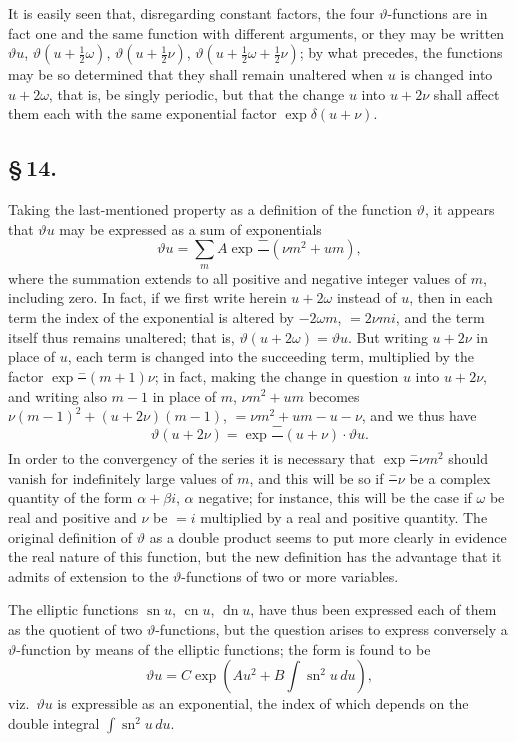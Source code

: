 \documentclass[11pt,a4paper]{article}
\DeclareMathOperator{\sn}{sn}
\DeclareMathOperator{\cn}{cn}
\DeclareMathOperator{\dn}{dn}
\begin{document}
It is easily seen that, disregarding constant factors, the four $\vartheta$-functions are in fact one and the same function with different arguments, or they may be written $\vartheta u$, $\vartheta(u + \frac{1}{2}\omega)$, $\vartheta(u + \frac{1}{2}\nu)$, $\vartheta(u + \frac{1}{2}\omega + \frac{1}{2}\nu)$; by what precedes, the functions may be so determined that they shall remain unaltered when $u$ is changed into $u + 2\omega$, that is, be singly periodic, but that the change $u$ into $u + 2\nu$ shall affect them each with the same exponential factor $\exp\delta(u + \nu)$.

\subsection*{\S\,14.}

Taking the last-mentioned property as a definition of the function $\vartheta$, it appears that $\vartheta u$ may be expressed as a sum of exponentials
\[
\vartheta u = \sum_{m} A\exp\frac{-}{}(\nu m^{2} + um),
\]
where the summation extends to all positive and negative integer values of $m$, including zero. In fact, if we first write herein $u + 2\omega$ instead of $u$, then in each term the index of the exponential is altered by $-2\omega m$, $= 2\nu m i$, and the term itself thus remains unaltered; that is, $\vartheta(u + 2\omega) = \vartheta u$. But writing $u + 2\nu$ in place of $u$, each term is changed into the succeeding term, multiplied by the factor $\exp\frac{-}{}(m + 1)\nu$; in fact, making the change in question $u$ into $u + 2\nu$, and writing also $m - 1$ in place of $m$, $\nu m^{2} + um$ becomes $\nu(m - 1)^{2} + (u + 2\nu)(m - 1)$, $= \nu m^{2} + um - u - \nu$, and we thus have
\[
\vartheta(u + 2\nu) = \exp\frac{-}{}(u + \nu) \cdot \vartheta u.
\]
In order to the convergency of the series it is necessary that $\exp\frac{-}{}\nu m^{2}$ should vanish for indefinitely large values of $m$, and this will be so if $\frac{-}{}\nu$ be a complex quantity of the form $\alpha + \beta i$, $\alpha$ negative; for instance, this will be the case if $\omega$ be real and positive and $\nu$ be $= i$ multiplied by a real and positive quantity. The original definition of $\vartheta$ as a double product seems to put more clearly in evidence the real nature of this function, but the new definition has the advantage that it admits of extension to the $\vartheta$-functions of two or more variables.

The elliptic functions $\sn u$, $\cn u$, $\dn u$, have thus been expressed each of them as the quotient of two $\vartheta$-functions, but the question arises to express conversely a $\vartheta$-function by means of the elliptic functions; the form is found to be
\[
\vartheta u = C\exp\left(Au^{2} + B\int\sn^{2}u\,du\right),
\]
viz.\ $\vartheta u$ is expressible as an exponential, the index of which depends on the double integral $\int\sn^{2}u\,du$.
\end{document}
